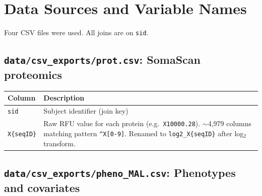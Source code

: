 \documentclass[11pt, letterpaper]{article}
\begin{document}
\section*{Data Sources and Variable Names}

Four CSV files were used. All joins are on \texttt{sid}.

\subsection*{\texttt{data/csv\_exports/prot.csv}: SomaScan proteomics}

\begin{tabular}{p{3.5cm}p{10cm}}
\toprule
Column & Description \\
\midrule
\texttt{sid}             & Subject identifier (join key) \\
\texttt{X\{seqID\}}      & Raw RFU value for each protein (e.g.\ \texttt{X10000.28}).
                           $\sim$4,979 columns matching pattern \texttt{\^{}X[0-9]}.
                           Renamed to \texttt{log2\_X\{seqID\}} after log$_2$ transform. \\
\bottomrule
\end{tabular}

\subsection*{\texttt{data/csv\_exports/pheno\_MAL.csv}: Phenotypes and covariates}
\end{document}
